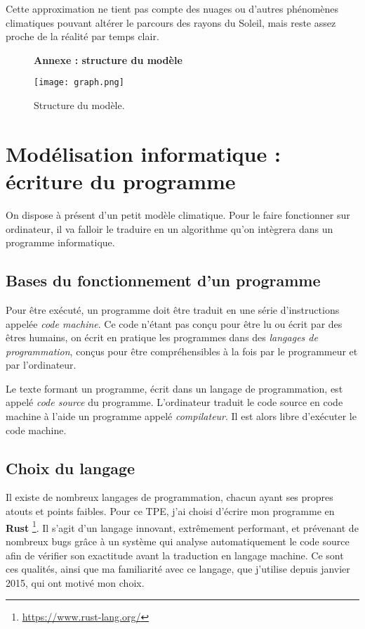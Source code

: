 \documentclass[12pt]{article}
\begin{document}
Cette approximation ne tient pas compte des nuages ou d'autres phénomènes climatiques pouvant altérer le parcours des rayons du Soleil, mais reste assez proche de la réalité par temps clair.

\clearpage
\begin{figure}[!htb]
	\centering
	{ \Large \textbf{Annexe : structure du modèle} \par\medskip }
	\centerline{\texttt{[image: graph.png]}}
	\caption{Structure du modèle.}
	\label{fig:model-structure}
\end{figure}

\clearpage
\section{Modélisation informatique : écriture du programme}

On dispose à présent d'un petit modèle climatique.
Pour le faire fonctionner sur ordinateur, il va falloir le traduire en un algorithme qu'on intègrera dans un programme informatique.

\subsection{Bases du fonctionnement d'un programme}

Pour être exécuté, un programme doit être traduit en une série d'instructions appelée \emph{code machine}.
Ce code n'étant pas conçu pour être lu ou écrit par des êtres humains, on écrit en pratique les programmes dans des \emph{langages de programmation}, conçus pour être compréhensibles à la fois par le programmeur et par l'ordinateur.

Le texte formant un programme, écrit dans un langage de programmation, est appelé \emph{code source} du programme.
L'ordinateur traduit le code source en code machine à l'aide un programme appelé \emph{compilateur}.
Il est alors libre d'exécuter le code machine.


\subsection{Choix du langage}

Il existe de nombreux langages de programmation, chacun ayant ses propres atouts et points faibles.
Pour ce TPE, j'ai choisi d'écrire mon programme en \textbf{Rust} \footnote{\url{https://www.rust-lang.org/}}.
Il s'agit d'un langage innovant, extrêmement performant, et prévenant de nombreux bugs grâce à un système qui analyse automatiquement le code source afin de vérifier son exactitude avant la traduction en langage machine.
Ce sont ces qualités, ainsi que ma familiarité avec ce langage, que j'utilise depuis janvier 2015, qui ont motivé mon choix.
\end{document}
